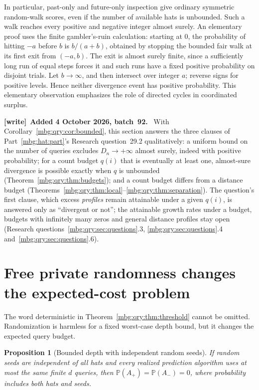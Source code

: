 \documentclass[11pt,letterpaper]{article}
\newtheorem{proposition}[theorem]{Proposition}
\theoremstyle{definition}
\newcommand{\Prb}{\mathbb P}
\newenvironment{writenote}[1][]{\par\smallskip\begingroup\small
 \noindent\textbf{[write]}\if\relax\detokenize{#1}\relax\else~\textbf{#1.}\fi\ }%
 {\par\endgroup\smallskip}
\begin{document}
In particular, past-only and future-only inspection give ordinary
symmetric random-walk scores, even if the number of available hats is
unbounded. Such a walk reaches every positive and negative integer
almost surely. An elementary proof uses the finite gambler's-ruin
calculation: starting at \(0\), the probability of hitting \(-a\)
before \(b\) is \(b/(a+b)\), obtained by stopping the bounded fair walk
at its first exit from \((-a,b)\). The exit is almost surely finite,
since a sufficiently long run of equal steps forces it and such
runs have a fixed positive probability on disjoint trials. Let
\(b\to\infty\), and then intersect over integer \(a\); reverse signs
for positive levels. Hence neither divergence event has positive
probability. This elementary observation emphasizes the role of
directed cycles in coordinated surplus.

\begin{writenote}[Added 4 October 2026, batch~92]
With Corollary~\ref{mbg:qry:cor:bounded}, this section answers the three clauses of Part~\ref{mbg:hat:part}'s Research question~29.2 qualitatively: a uniform bound on the number of queries excludes $D_n\to+\infty$ almost surely, indeed with positive probability; for a count budget $q(i)$ that is eventually at least one, almost-sure divergence is possible exactly when $q$ is unbounded (Theorem~\ref{mbg:qry:thm:budgets}); and a count budget differs from a distance budget (Theorems~\ref{mbg:qry:thm:local}--\ref{mbg:qry:thm:separation}). The question's first clause, which excess \emph{profiles} remain attainable under a given $q(i)$, is answered only as ``divergent or not''; the attainable growth rates under a budget, budgets with infinitely many zeros and general distance profiles stay open (Research questions~\ref{mbg:qry:sec:questions}.3, \ref{mbg:qry:sec:questions}.4 and~\ref{mbg:qry:sec:questions}.6).
\end{writenote}

\section{Free private randomness changes the expected-cost problem}
\label{mbg:qry:sec:random}

The word deterministic in Theorem~\ref{mbg:qry:thm:threshold} cannot be omitted.
Randomization is harmless for a fixed worst-case depth bound, but
it changes the expected query budget.

\begin{proposition}[Bounded depth with independent random seeds]
\label{mbg:qry:prop:randomdepth}
If random seeds are independent of all hats and every realized prediction
algorithm uses at most the same finite \(d\) queries, then
\(\Prb(A_+)=\Prb(A_-)=0\), where probability includes both hats and seeds.
\end{proposition}
\end{document}
